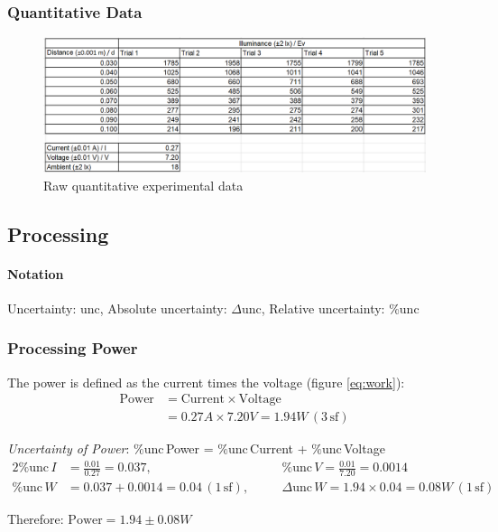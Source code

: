 \documentclass[a4paper,12pt]{article}
\newcommand{\absun}{\Delta \text{unc}\,}
\newcommand{\relun}{\% \text{unc}\,}
\newcommand{\tsf}{\,\text{sf}}
\begin{document}
\subsubsection*{Quantitative Data}
\begin{figure}[H]
    \centering
    \includegraphics[width=\textwidth]{assets/rawdata.png}
    \caption{Raw quantitative experimental data}
    \label{fig:raw}
\end{figure}

\subsection{Processing}
\paragraph{Notation}

Uncertainty: unc, Absolute uncertainty: $\Delta$unc, Relative uncertainty: \%unc


\subsubsection{Processing Power}
The power is defined as the current times the voltage (figure \ref{eq:work}):
\begin{align*}
\text{Power} &= \text{Current} \times \text{Voltage}\\
        &= 0.27\si{A} \times 7.20\si{V} = 1.94 \si{W} \,(3 \tsf)
\end{align*}

\textit{Uncertainty of Power}: $\relun$Power =  $\relun$Current +  $\relun$Voltage
\begin{alignat*}{2}
    \% \text{unc}\, \si{I} &= \frac{0.01}{0.27} = 0.037,\quad &&\relun \si{V} = \frac{0.01}{7.20} = 0.0014\\
    \relun \si{W} &= 0.037 + 0.0014 = 0.04 \,(1 \tsf), \quad &&\absun \si{W} = 1.94 \times 0.04 = 0.08\si{W} \,(1 \tsf)
\end{alignat*}

Therefore: $\text{Power} = 1.94 \pm 0.08 \si{W}$
\end{document}
